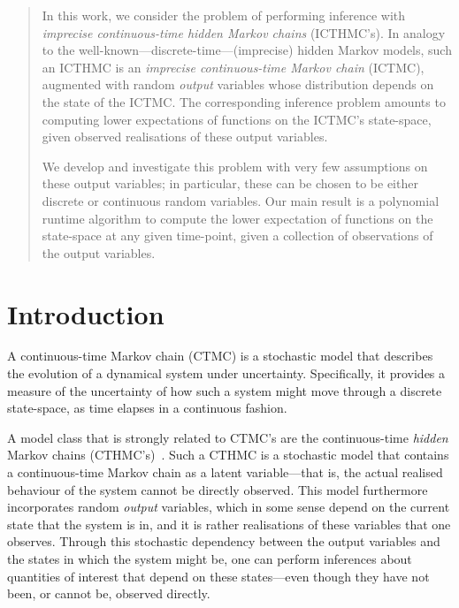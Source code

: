 \documentclass[twoside,11pt]{article}
\begin{document}
\begin{abstract}
In this work, we consider the problem of performing inference with \emph{imprecise continuous-time hidden Markov chains} (ICTHMC's). In analogy to the well-known---discrete-time---(imprecise) hidden Markov models, such an ICTHMC is an \emph{imprecise continuous-time Markov chain} (ICTMC), augmented with random \emph{output} variables whose distribution depends on the state of the ICTMC. The corresponding inference problem amounts to computing lower expectations of functions on the ICTMC's state-space, given observed realisations of these output variables.

We develop and investigate this problem with very few assumptions on these output variables; in particular, these can be chosen to be either discrete or continuous random variables. Our main result is a polynomial runtime algorithm to compute the lower expectation of functions on the state-space at any given time-point, given a collection of observations of the output variables.
\end{abstract}

\section{Introduction}\label{sec:introduction}

A continuous-time Markov chain (CTMC) is a stochastic model that describes the evolution of a dynamical system under uncertainty. Specifically, it provides a measure of the uncertainty of how such a system might move through a discrete state-space, as time elapses in a continuous fashion.

A model class that is strongly related to CTMC's are the continuous-time \emph{hidden} Markov chains (CTHMC's)~\cite{wei2002continuous}. Such a CTHMC is a stochastic model that contains a continuous-time Markov chain as a latent variable---that is, the actual realised behaviour of the system cannot be directly observed. This model furthermore incorporates random \emph{output} variables, which in some sense depend on the current state that the system is in, and it is rather realisations of these variables that one observes. Through this stochastic dependency between the output variables and the states in which the system might be, one can perform inferences about quantities of interest that depend on these states---even though they have not been, or cannot be, observed directly.

\end{document}
